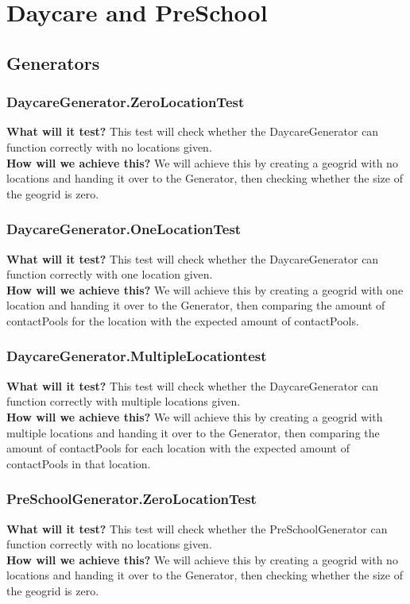 \documentclass{article}
\begin{document}
\section{Daycare and PreSchool}
\subsection{Generators}
\subsubsection{DaycareGenerator.ZeroLocationTest}
\textbf{What will it test?}
This test will check whether the DaycareGenerator can function correctly with no locations given.\\
\newline
\textbf{How will we achieve this?}
We will achieve this by creating a geogrid with no locations and handing it over to the Generator, then checking whether the size of the geogrid is zero.

\subsubsection{DaycareGenerator.OneLocationTest}
\textbf{What will it test?}
This test will check whether the DaycareGenerator can function correctly with one location given. \\
\newline
\textbf{How will we achieve this?}
We will achieve this by creating a geogrid with one location and handing it over to the Generator, then comparing the amount of contactPools for the location with the expected amount of contactPools.

\subsubsection{DaycareGenerator.MultipleLocationtest}
\textbf{What will it test?}
This test will check whether the DaycareGenerator can function correctly with multiple locations given. \\
\newline
\textbf{How will we achieve this?}
We will achieve this by creating a geogrid with multiple locations and handing it over to the Generator, then comparing the amount of contactPools for each location with the expected amount of contactPools in that location.

\subsubsection{PreSchoolGenerator.ZeroLocationTest}
\textbf{What will it test?}
This test will check whether the PreSchoolGenerator can function correctly with no locations given.\\
\newline
\textbf{How will we achieve this?}
We will achieve this by creating a geogrid with no locations and handing it over to the Generator, then checking whether the size of the geogrid is zero.
\end{document}
